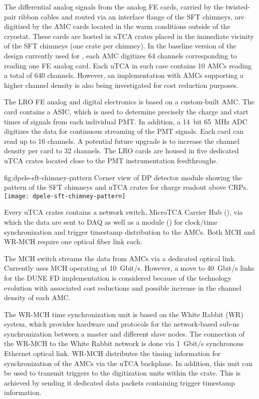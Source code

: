 The differential analog signals from the analog FE cards, carried by the twisted-pair ribbon cables and routed via an interface flange of the SFT chimneys, are digitized by the AMC cards located in the warm conditions outside of the cryostat. These cards are hosted in uTCA crates placed in the immediate vicinity of the SFT chimneys (one crate per chimney). In the baseline version of the design currently used for , each AMC digitizes \num{64} channels corresponding to reading one FE analog card. Each uTCA in such case contains \num{10} AMCs reading a total of \num{640} channels. However, an implementation with AMCs supporting a higher channel density is also being investigated for cost reduction purposes.

The LRO FE analog and digital electronics is based on a custom-built AMC. The card contains a  ASIC, which is used to determine precisely the charge and start times of signals from each individual PMT. In addition, a \SI{14}{bit} \SI{65}{MHz} ADC digitizes the data for continuous streaming of the PMT signals. Each card can read up to \num{16} channels. A potential future upgrade is to increase the channel density per card to \num{32} channels. The LRO cards are housed in five dedicated uTCA crates located close to the PMT instrumentation feedthroughs.

\begin{dunefigure}{fig:dpele-sft-chimney-pattern}
{Corner view of DP detector module showing the pattern of the SFT chimneys and uTCA crates for charge readout above CRPs.}
\texttt{[image: dpele-sft-chimney-pattern]}
\end{dunefigure}

Every uTCA crates contains a network switch, MicroTCA Carrier Hub (), via which the data are sent to DAQ as well as a module () for clock/time synchronization and trigger timestamp distribution to the AMCs. Both MCH and WR-MCH require one optical fiber link each. 

The MCH switch streams the data from AMCs via a dedicated optical link. Currently  uses MCH operating at \SI{10}{Gbit/s}. However, a move to \SI{40}{Gbit/s} links for the DUNE FD implementation is considered because of the technology evolution with associated cost reductions and possible increase in the channel density of each AMC.

The WR-MCH time synchronization unit is based on the White Rabbit (WR) system, which provides hardware and protocols for the network-based sub-ns synchronization between a master and different slave nodes. The connection of the WR-MCH to the White Rabbit network is done via \SI{1}{Gbit/s} synchronous Ethernet optical link. WR-MCH distributes the timing information for synchronization of the AMCs via the uTCA backplane. In addition, this unit can be used to transmit triggers to the digitization units within the crate. This is achieved by sending it dedicated data packets containing trigger timestamp information. 

